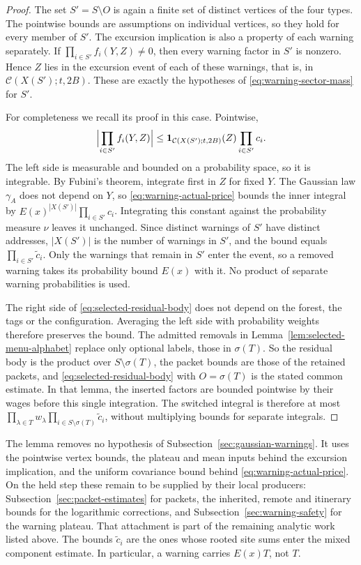 \begin{proof}
The set $S'=S\setminus O$ is again a finite set of distinct vertices
of the four types. The pointwise bounds are assumptions on individual
vertices, so they hold for every member of $S'$. The excursion
implication is also a property of each warning separately. If
$\prod_{i\in S'}f_i(Y,Z)\ne0$, then every warning factor in $S'$ is
nonzero. Hence $Z$ lies in the excursion event of each of these
warnings, that is, in $\mathcal C(X(S');t,2B)$. These are exactly the
hypotheses of \eqref{eq:warning-sector-mass} for $S'$.

For completeness we recall its proof in this case. Pointwise,
\[
 \Bigl|\prod_{i\in S'}f_i(Y,Z)\Bigr|
 \le\mathbf1_{\mathcal C(X(S');t,2B)}(Z)\prod_{i\in S'}c_i .
\]
The left side is measurable and bounded on a probability space, so it
is integrable. By Fubini's theorem, integrate first in $Z$ for fixed
$Y$. The Gaussian law $\gamma_A$ does not depend on $Y$, so
\eqref{eq:warning-actual-price} bounds the inner integral by
$E(x)^{|X(S')|}\prod_{i\in S'}c_i$. Integrating this constant against
the probability measure $\nu$ leaves it unchanged. Since distinct
warnings of $S'$ have distinct addresses, $|X(S')|$ is the number of
warnings in $S'$, and the bound equals
$\prod_{i\in S'}\widetilde c_i$. Only the warnings that remain in
$S'$ enter the event, so a removed warning takes its probability bound
$E(x)$ with it. No product of separate warning probabilities is used.

The right side of \eqref{eq:selected-residual-body} does not depend on
the forest, the tags or the configuration. Averaging the left side
with probability weights therefore preserves the bound. The admitted
removals in Lemma~\ref{lem:selected-menu-alphabet} replace only
optional labels, those in $\sigma(T)$. So the residual body is the
product over $S\setminus\sigma(T)$, the packet bounds are those of the
retained packets, and \eqref{eq:selected-residual-body} with
$O=\sigma(T)$ is the stated common estimate. In that lemma, the
inserted factors are bounded pointwise by their wages before this
single integration. The switched integral is therefore at most
$\prod_{\lambda\in T}w_\lambda\prod_{i\in S\setminus\sigma(T)}
\widetilde c_i$, without multiplying bounds for separate integrals.
\end{proof}

The lemma removes no hypothesis of
Subsection~\ref{sec:gaussian-warnings}. It uses the pointwise vertex bounds,
the plateau and mean inputs behind the excursion implication, and the
uniform covariance bound behind \eqref{eq:warning-actual-price}. On the
held step these remain to be supplied by their local producers:
Subsection~\ref{sec:packet-estimates} for packets, the inherited, remote
and itinerary bounds for the logarithmic corrections, and
Subsection~\ref{sec:warning-safety} for the warning plateau. That
attachment is part of the remaining analytic work listed above. The
bounds $\widetilde c_i$ are the ones whose rooted site sums enter the
mixed component estimate. In particular, a warning carries $E(x)T$,
not $T$.


